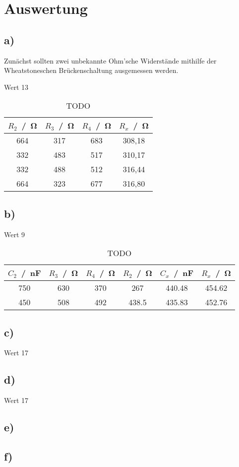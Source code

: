 \section{Auswertung} \label{sec:Auswertung}
\subsection{a)}
Zunächst sollten zwei unbekannte Ohm'sche Widerstände mithilfe der Wheatstoneschen Brückenschaltung ausgemessen werden.

Wert 13

\begin{table}
\centering
\caption{TODO}
\label{tab:todo1}
\begin{tabular}{c c c c}
\toprule
$R_2$ \,/\, \si{\ohm} &
$R_3$ \,/\, \si{\ohm} &
$R_4$ \,/\, \si{\ohm} &
$R_x$ \,/\, \si{\ohm} \\
\midrule
664	& 317 &	683	&	308,18 \\
332	& 483 &	517	&	310,17 \\
332	& 488 &	512	&	316,44 \\
664	& 323 &	677	&	316,80 \\
\bottomrule
\end{tabular}
\end{table}

\subsection{b)}

Wert 9

\begin{table}
  \centering
  \caption{TODO}
  \label{tab:todo2}
  \begin{tabular}{c c c c c c}
    \toprule
    $C_2$ \,/\, \si{\nano\farad} &
    $R_3$ \,/\, \si{\ohm} &
    $R_4$ \,/\, \si{\ohm} &
    $R_2$ \,/\, \si{\ohm} &
    $C_x$ \,/\, \si{\nano\farad} &
    $R_x$ \,/\, \si{\ohm} \\
    \midrule
    750 &	630 &	370 &	267		& 440.48 & 454.62 \\
    450 &	508 &	492 &	438.5	&	435.83 & 452.76 \\
    \bottomrule
  \end{tabular}
\end{table}


\subsection{c)}

Wert 17


\subsection{d)}

Wert 17

\subsection{e)}


\subsection{f)}
